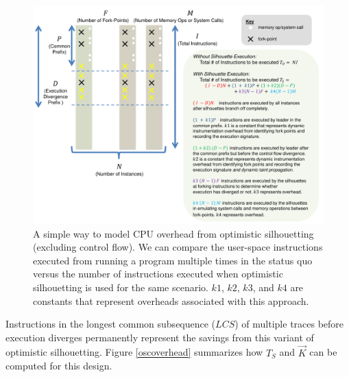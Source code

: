 \begin{figure}
  \centering
  \includegraphics[scale=0.75, trim=3cm 0cm 1cm 0cm]{calc2.pdf}
  \caption[Modeling CPU overhead from optimistic silhouetting (excluding control flow)]%
          {A simple way to model CPU overhead from optimistic silhouetting (excluding control flow).
            We can compare the user-space instructions executed from running
            a program multiple times in the status quo
            versus the number of instructions executed
            when optimistic silhouetting is used for
            the same scenario. $k1$, $k2$, $k3$, and $k4$
            are constants that represent overheads
            associated with this approach.}
  \label{osncoverhead}
\end{figure}

 \newline
Instructions in the longest common subsequence ($LCS$)
of multiple traces before execution
diverges permanently represent the savings from 
this variant of optimistic silhouetting.
Figure \ref{oscoverhead} summarizes
how $T_{S}$ and $\vec K$ can be computed
for this design. 

